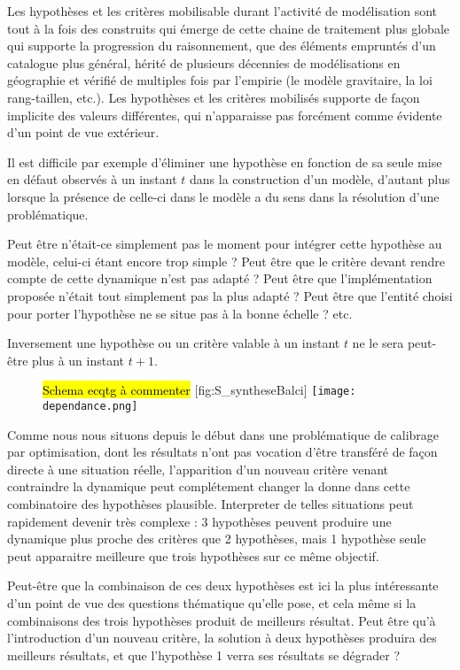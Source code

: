 Les hypothèses et les critères mobilisable durant l'activité de modélisation sont tout à la fois des construits qui émerge de cette chaine de traitement plus globale qui supporte la progression du raisonnement, que des éléments empruntés d'un catalogue plus général, hérité de plusieurs décennies de modélisations en géographie et vérifié de multiples fois par l'empirie (le modèle gravitaire, la loi rang-taillen, etc.). Les hypothèses et les critères mobilisés supporte de façon implicite des valeurs différentes, qui n'apparaisse pas forcément comme évidente d'un point de vue extérieur. 

Il est difficile par exemple d'éliminer une hypothèse en fonction de sa seule mise en défaut observés à un instant $t$ dans la construction d'un modèle, d'autant plus lorsque la présence de celle-ci dans le modèle a du sens dans la résolution d'une problématique. 

Peut être n'était-ce simplement pas le moment pour intégrer cette hypothèse au modèle, celui-ci étant encore trop simple ? Peut être que le critère devant rendre compte de cette dynamique n'est pas adapté ? Peut être que l'implémentation proposée n'était tout simplement pas la plus adapté ? Peut être que l'entité choisi pour porter l'hypothèse ne se situe pas à la bonne échelle ? etc. 

Inversement une hypothèse ou un critère valable à un instant $t$ ne le sera peut-être plus à un instant $t + 1$.

\begin{figure}[htbp]
\begin{sidecaption}[fortoc]{ \hl{Schema ecqtg à commenter} \autocite{Balci1986}}[fig:S_syntheseBalci]
  \centering
 \texttt{[image: dependance.png]}
  \end{sidecaption}
\end{figure}

Comme nous nous situons depuis le début dans une problématique de calibrage par optimisation, dont les résultats n'ont pas vocation d'être transféré de façon directe à une situation réelle, l'apparition d'un nouveau critère venant contraindre la dynamique peut complétement changer la donne dans cette combinatoire des hypothèses plausible. Interpreter de telles situations peut rapidement devenir très complexe : 3 hypothèses peuvent produire une dynamique plus proche des critères que 2 hypothèses, mais 1 hypothèse seule peut apparaitre meilleure que trois hypothèses sur ce même objectif.

Peut-être que la combinaison de ces deux hypothèses est ici la plus intéressante d'un point de vue des questions thématique qu'elle pose, et cela même si la combinaisons des trois hypothèses produit de meilleurs résultat. Peut être qu'à l'introduction d'un nouveau critère, la solution à deux hypothèses produira des meilleurs résultats, et que l'hypothèse 1 verra ses résultats se dégrader ? 

